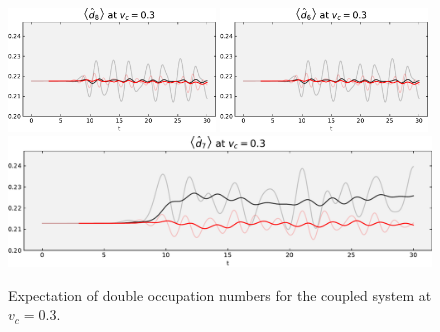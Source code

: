\begin{figure}[!hbt]
{{\begin{minipage}[b]{.59\textwidth}
                \includegraphics[width=0.49\textwidth]{graph/double_occupation/double_occupation_vc_03_site_8.pdf}
                \includegraphics[width=0.49\textwidth]{graph/double_occupation/double_occupation_vc_03_site_6.pdf}
                \includegraphics[width=1.00\textwidth]{graph/double_occupation/double_occupation_vc_03_site_7.pdf}
        \caption{Expectation of double occupation numbers for the coupled system at $v_c = 0.3$.\newline}
        \label{fig:double_occupation_vc_03}
    \end{minipage}}}
\end{figure}
\newpage

